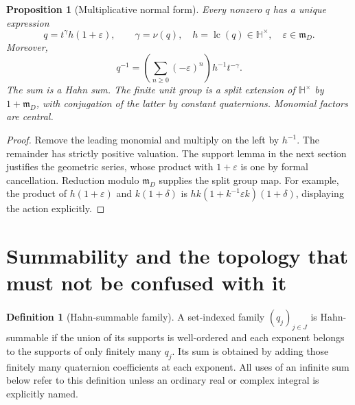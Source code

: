 \documentclass[11pt,letterpaper]{article}
\newtheorem{proposition}[theorem]{Proposition}
\theoremstyle{definition}
\newtheorem{definition}[theorem]{Definition}
\newcommand{\HH}{\mathbb H}
\newcommand{\mm}{\mathfrak m}
\newcommand{\val}{\nu}
\begin{document}
\begin{proposition}[Multiplicative normal form]
\label{prop:mult-normal}
Every nonzero $q$ has a unique expression
\begin{equation}
 q=t^\gamma h(1+\varepsilon),\qquad
 \gamma=\val(q),\quad h=\operatorname{lc}(q)\in\HH^\times,
 \quad\varepsilon\in\mm_D.
 \label{eq:mult-normal}
\end{equation}
Moreover,
\[
 q^{-1}=\left(\sum_{n\ge0}(-\varepsilon)^n\right)h^{-1}t^{-\gamma}.
\]
The sum is a Hahn sum. The finite unit group is a split extension of
$\HH^\times$ by $1+\mm_D$, with conjugation of the latter by constant
quaternions. Monomial factors are central.
\end{proposition}
\begin{proof}
Remove the leading monomial and multiply on the left by $h^{-1}$. The remainder
has strictly positive valuation. The support lemma in the next section
justifies the geometric series, whose product with $1+\varepsilon$ is one by
formal cancellation. Reduction modulo $\mm_D$ supplies the split group map.
For example, the product of $h(1+\varepsilon)$ and $k(1+\delta)$ is
$hk(1+k^{-1}\varepsilon k)(1+\delta)$, displaying the action explicitly.
\end{proof}

\section{Summability and the topology that must not be confused with it}
\label{sec:support}
\begin{definition}[Hahn-summable family]
A set-indexed family $(q_j)_{j\in J}$ is Hahn-summable if the union of its
supports is well-ordered and each exponent belongs to the supports of only
finitely many $q_j$. Its sum is obtained by adding those finitely many
quaternion coefficients at each exponent. All uses of an infinite sum below
refer to this definition unless an ordinary real or complex integral is
explicitly named.
\end{definition}
\end{document}
